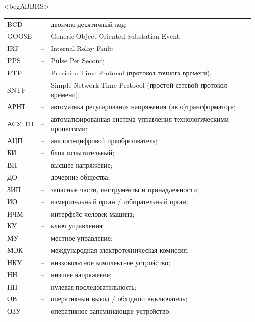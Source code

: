 \color{unimain}\section*{}
{\color{white}\fontsize{0.1pt}{0.1pt}\selectfont<begABBRS>}
\color{black}
\begin{longtable}{>{\raggedright\arraybackslash}m{2cm}>{\raggedright\arraybackslash}m{0.5cm}>{\raggedright\arraybackslash}m{20cm}}
\endfirsthead\endhead\endfoot\endlastfoot
BCD & -- & двоично-десятичный код; \\
GOOSE & -- & Generic Object-Oriented Substation Event; \\
IRF & -- & Internal Relay Fault; \\
PPS & -- & Pulse Per Second; \\
PTP & -- & Precision Time Protocol (протокол точного времени); \\
SNTP & -- & Simple Network Time Protocol (простой сетевой протокол времени); \\
АРНТ & -- & автоматика регулирования напряжения (авто)трансформатора; \\
АСУ~ТП & -- & автоматизированная система управления технологическими процессами; \\
АЦП & -- & аналого-цифровой преобразователь; \\
БИ & -- & блок испытательный; \\
ВН & -- & высшее напряжение; \\
ДО & -- & дочерние общества; \\
ЗИП & -- & запасные части, инструменты и принадлежности; \\
ИО & -- & измерительный орган / избирательный орган; \\
ИЧМ & -- & интерфейс человек-машина; \\
КУ & -- & ключ управления; \\
МУ & -- & местное управление; \\
МЭК & -- & международная электротехническая комиссия; \\
НКУ & -- & низковольтное комплектное устройство; \\
НН & -- & низшее напряжение; \\
НП & -- & нулевая последовательность; \\
ОВ & -- & оперативный вывод / обходной выключатель; \\
ОЗУ & -- & оперативное запоминающее устройство; \\

\end{longtable}
